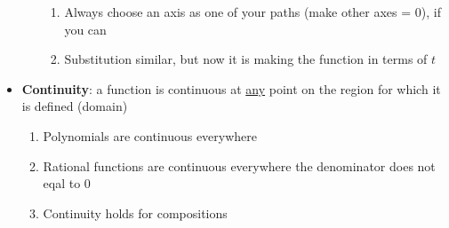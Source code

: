 \documentclass{article}
\begin{document}
\begin{itemize}
\begin{itemize}
\begin{enumerate}
      \item Always choose an axis as one of your paths (make other axes = 0), if you can
      \item Substitution similar, but now it is making the function in terms of $t$
    \end{enumerate}
  \end{itemize}
  \item \textbf{Continuity}: a function is continuous at \underline{any} point on the region for which it is defined (domain)
  \begin{enumerate}
    \item Polynomials are continuous everywhere
    \item Rational functions are continuous everywhere the denominator does not eqal to 0
    \item Continuity holds for compositions
  \end{enumerate}
\end{itemize}
\end{document}
